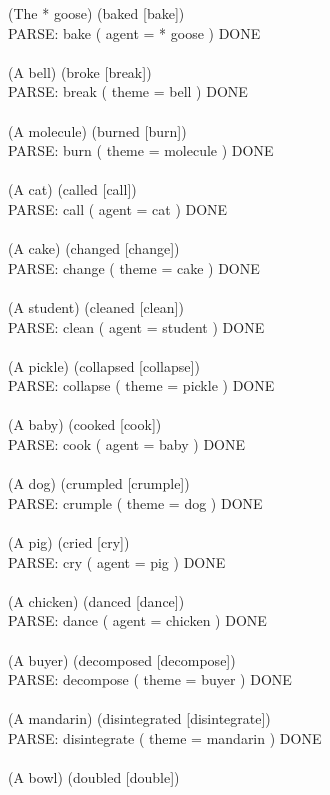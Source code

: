 \documentclass{article} \usepackage{iclr2022_conference,times}
\newcommand{\prompt}[1]{{\footnotesize \textsf{#1}}}
\begin{document}
\prompt{(The * goose) (baked [bake]) \\
PARSE: bake ( agent = * goose ) DONE \\
 \\
(A bell) (broke [break]) \\
PARSE: break ( theme = bell ) DONE \\
 \\
(A molecule) (burned [burn]) \\
PARSE: burn ( theme = molecule ) DONE \\
 \\
(A cat) (called [call]) \\
PARSE: call ( agent = cat ) DONE \\
 \\
(A cake) (changed [change]) \\
PARSE: change ( theme = cake ) DONE \\
 \\
(A student) (cleaned [clean]) \\
PARSE: clean ( agent = student ) DONE \\
 \\
(A pickle) (collapsed [collapse]) \\
PARSE: collapse ( theme = pickle ) DONE \\
 \\
(A baby) (cooked [cook]) \\
PARSE: cook ( agent = baby ) DONE \\
 \\
(A dog) (crumpled [crumple]) \\
PARSE: crumple ( theme = dog ) DONE \\
 \\
(A pig) (cried [cry]) \\
PARSE: cry ( agent = pig ) DONE \\
 \\
(A chicken) (danced [dance]) \\
PARSE: dance ( agent = chicken ) DONE \\
 \\
(A buyer) (decomposed [decompose]) \\
PARSE: decompose ( theme = buyer ) DONE \\
 \\
(A mandarin) (disintegrated [disintegrate]) \\
PARSE: disintegrate ( theme = mandarin ) DONE \\
 \\
(A bowl) (doubled [double]) \\
}
\end{document}
